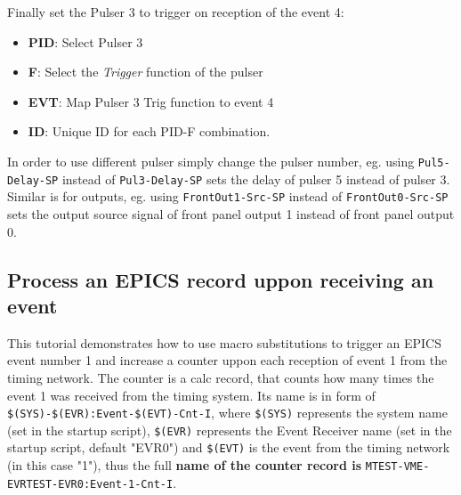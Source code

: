 \documentclass[12pt,a4paper]{article}
\begin{document}
Finally set the Pulser 3 to trigger on reception of the event 4:
\begin{itemize}
	\item \textbf{PID}: Select Pulser 3
	\item \textbf{F}: Select the \textit{Trigger} function of the pulser
	\item \textbf{EVT}: Map Pulser 3 Trig function to event 4
	\item \textbf{ID}: Unique ID for each PID-F combination.
\end{itemize}

In order to use different pulser simply change the pulser number, eg. using \texttt{Pul5-Delay-SP} instead of \texttt{Pul3-Delay-SP} sets the delay of pulser 5 instead of pulser 3.
Similar is for outputs, eg. using \texttt{FrontOut1-Src-SP} instead of \texttt{FrontOut0-Src-SP} sets the output source signal of front panel output 1 instead of front panel output 0.

\subsection{Process an EPICS record uppon receiving an event}
This tutorial demonstrates how to use macro substitutions to trigger an EPICS event number 1 and increase a counter uppon each reception of event 1 from the timing network.
The counter is a calc record, that counts how many times the event 1 was received from the timing system. Its name is in form of \texttt{\$(SYS)-\$(EVR):Event-\$(EVT)-Cnt-I}, where \texttt{\$(SYS)} represents the system name (set in the startup script), \texttt{\$(EVR)} represents the Event Receiver name (set in the startup script, default "EVR0") and \texttt{\$(EVT)} is the event from the timing network (in this case "1"), thus the full \textbf{name of the counter record is} \texttt{MTEST-VME-EVRTEST-EVR0:Event-1-Cnt-I}.
\end{document}
